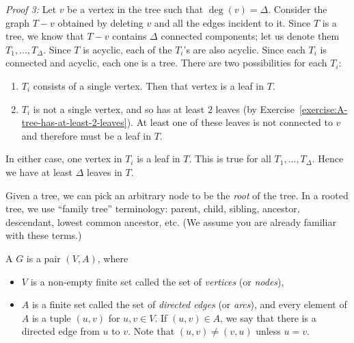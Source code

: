 \begin{flex}
\begin{solution}
\noindent
\emph{Proof 3:} Let $v$ be a vertex in the tree such that $\deg(v) = \Delta.$ Consider the graph $T - v$ obtained by deleting $v$ and all the edges incident to it. Since $T$ is a tree, we know that $T-v$ contains $\Delta$ connected components; let us denote them $T_1,\ldots, T_{\Delta}$.  Since $T$ is acyclic, each of the $T_i$'s are also acyclic. Since each $T_i$ is connected and acyclic, each one is a tree. There are two possibilities for each $T_i$:
\begin{enumerate}
    \item $T_i$ consists of a single vertex. Then that vertex is a leaf in $T$.
    \item $T_i$ is not a single vertex, and so has at least $2$ leaves (by Exercise~\ref{exercise:A-tree-has-at-least-2-leaves}). At least one of these leaves is not connected to $v$ and therefore must be a leaf in $T$.
\end{enumerate} 
In either case, one vertex in $T_i$ is a leaf in $T$. This is true for all $T_1, \ldots, T_{\Delta}$. Hence we have at least $\Delta$ leaves in $T$.

\end{solution}
\end{flex}

\begin{note}
\label{note:Root-parent-child-sibling-etc}
Given a tree, we can pick an arbitrary node to be the \emph{root} of the tree. In a rooted tree, we use ``family tree'' terminology: parent, child, sibling, ancestor, descendant, lowest common ancestor, etc. (We assume you are already familiar with these terms.)

\end{note}

\begin{definition}
\label{definition:Directed-graph}
A  $G$ is a pair $(V,A)$, where 
\begin{itemize}
    \item $V$ is a non-empty finite set called the set of \emph{vertices} (or \emph{nodes}),
    \item $A$ is a finite set called the set of \emph{directed edges} (or \emph{arcs}), and every element of $A$ is a tuple $(u,v)$ for $u, v \in V$. If $(u,v) \in A$, we say that there is a directed edge from $u$ to $v$. Note that $(u,v) \neq (v,u)$ unless $u = v$.
\end{itemize}

\end{definition}

